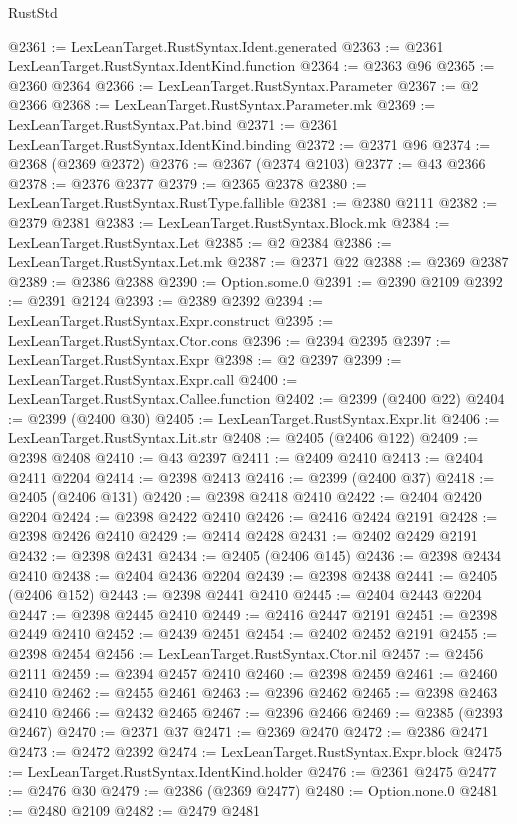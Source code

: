 \begin{lexlean}{RustStd}
\begin{coremodule}
@2361 := LexLeanTarget.RustSyntax.Ident.generated
@2363 := @2361 LexLeanTarget.RustSyntax.IdentKind.function
@2364 := @2363 @96
@2365 := @2360 @2364
@2366 := LexLeanTarget.RustSyntax.Parameter
@2367 := @2 @2366
@2368 := LexLeanTarget.RustSyntax.Parameter.mk
@2369 := LexLeanTarget.RustSyntax.Pat.bind
@2371 := @2361 LexLeanTarget.RustSyntax.IdentKind.binding
@2372 := @2371 @96
@2374 := @2368 (@2369 @2372)
@2376 := @2367 (@2374 @2103)
@2377 := @43 @2366
@2378 := @2376 @2377
@2379 := @2365 @2378
@2380 := LexLeanTarget.RustSyntax.RustType.fallible
@2381 := @2380 @2111
@2382 := @2379 @2381
@2383 := LexLeanTarget.RustSyntax.Block.mk
@2384 := LexLeanTarget.RustSyntax.Let
@2385 := @2 @2384
@2386 := LexLeanTarget.RustSyntax.Let.mk
@2387 := @2371 @22
@2388 := @2369 @2387
@2389 := @2386 @2388
@2390 := Option.some.{0}
@2391 := @2390 @2109
@2392 := @2391 @2124
@2393 := @2389 @2392
@2394 := LexLeanTarget.RustSyntax.Expr.construct
@2395 := LexLeanTarget.RustSyntax.Ctor.cons
@2396 := @2394 @2395
@2397 := LexLeanTarget.RustSyntax.Expr
@2398 := @2 @2397
@2399 := LexLeanTarget.RustSyntax.Expr.call
@2400 := LexLeanTarget.RustSyntax.Callee.function
@2402 := @2399 (@2400 @22)
@2404 := @2399 (@2400 @30)
@2405 := LexLeanTarget.RustSyntax.Expr.lit
@2406 := LexLeanTarget.RustSyntax.Lit.str
@2408 := @2405 (@2406 @122)
@2409 := @2398 @2408
@2410 := @43 @2397
@2411 := @2409 @2410
@2413 := @2404 @2411 @2204
@2414 := @2398 @2413
@2416 := @2399 (@2400 @37)
@2418 := @2405 (@2406 @131)
@2420 := @2398 @2418 @2410
@2422 := @2404 @2420 @2204
@2424 := @2398 @2422 @2410
@2426 := @2416 @2424 @2191
@2428 := @2398 @2426 @2410
@2429 := @2414 @2428
@2431 := @2402 @2429 @2191
@2432 := @2398 @2431
@2434 := @2405 (@2406 @145)
@2436 := @2398 @2434 @2410
@2438 := @2404 @2436 @2204
@2439 := @2398 @2438
@2441 := @2405 (@2406 @152)
@2443 := @2398 @2441 @2410
@2445 := @2404 @2443 @2204
@2447 := @2398 @2445 @2410
@2449 := @2416 @2447 @2191
@2451 := @2398 @2449 @2410
@2452 := @2439 @2451
@2454 := @2402 @2452 @2191
@2455 := @2398 @2454
@2456 := LexLeanTarget.RustSyntax.Ctor.nil
@2457 := @2456 @2111
@2459 := @2394 @2457 @2410
@2460 := @2398 @2459
@2461 := @2460 @2410
@2462 := @2455 @2461
@2463 := @2396 @2462
@2465 := @2398 @2463 @2410
@2466 := @2432 @2465
@2467 := @2396 @2466
@2469 := @2385 (@2393 @2467)
@2470 := @2371 @37
@2471 := @2369 @2470
@2472 := @2386 @2471
@2473 := @2472 @2392
@2474 := LexLeanTarget.RustSyntax.Expr.block
@2475 := LexLeanTarget.RustSyntax.IdentKind.holder
@2476 := @2361 @2475
@2477 := @2476 @30
@2479 := @2386 (@2369 @2477)
@2480 := Option.none.{0}
@2481 := @2480 @2109
@2482 := @2479 @2481

\end{coremodule}
\end{lexlean}
